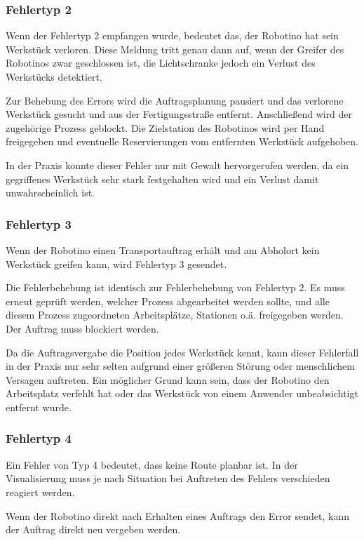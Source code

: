 \subsubsection{Fehlertyp 2}

Wenn der Fehlertyp 2 empfangen wurde, bedeutet das, der Robotino hat sein Werkstück verloren. Diese Meldung tritt genau dann auf, wenn der Greifer des Robotinos zwar geschlossen ist, die Lichtschranke jedoch ein Verlust des Werkstücks detektiert. 

Zur Behebung des Errors wird die Auftragsplanung pausiert und das verlorene Werkstück gesucht und aus der Fertigungsstraße entfernt. Anschließend wird der zugehörige Prozess geblockt. Die Zielstation des Robotinos wird per Hand freigegeben und eventuelle Reservierungen vom entfernten Werkstück aufgehoben. 

In der Praxis konnte dieser Fehler nur mit Gewalt hervorgerufen werden, da ein gegriffenes Werkstück sehr stark festgehalten wird und ein Verlust damit unwahrscheinlich ist. 

\subsubsection{Fehlertyp 3}

Wenn der Robotino einen Transportauftrag erhält und am Abholort kein Werkstück greifen kann, wird Fehlertyp 3 gesendet. 

Die Fehlerbehebung ist identisch zur Fehlerbehebung von Fehlertyp 2. Es muss erneut geprüft werden, welcher Prozess abgearbeitet werden sollte, und alle diesem Prozess zugeordneten Arbeitsplätze, Stationen o.ä. freigegeben werden. Der Auftrag muss blockiert werden.

Da die Auftragsvergabe die Position jedes Werkstück kennt, kann dieser Fehlerfall in der Praxis nur sehr selten aufgrund einer größeren Störung oder menschlichem Versagen auftreten. Ein möglicher Grund kann sein, dass der Robotino den Arbeitsplatz verfehlt hat oder das Werkstück von einem Anwender unbeabsichtigt entfernt wurde. 

\subsubsection{Fehlertyp 4}

Ein Fehler von Typ 4 bedeutet, dass keine Route planbar ist. In der Visualisierung muss je nach Situation bei Auftreten des Fehlers verschieden reagiert werden. 

Wenn der Robotino direkt nach Erhalten eines Auftrags den Error sendet, kann der Auftrag direkt neu vergeben werden. 

